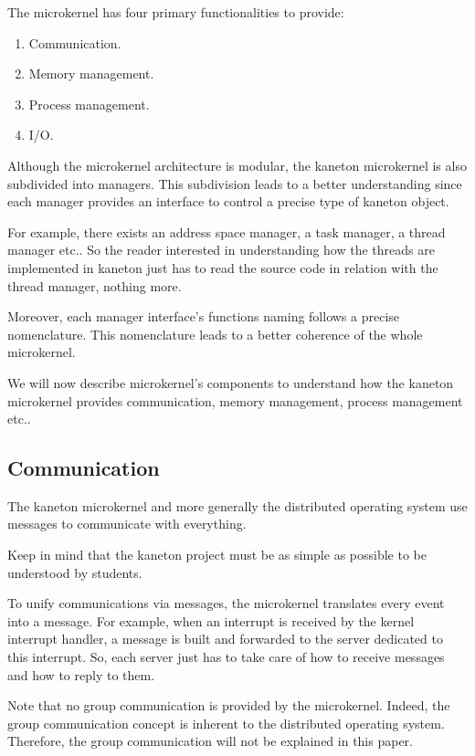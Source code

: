 \begin{multicols}{2}
The microkernel has four primary functionalities to provide:

\begin{enumerate}
  \item
    Communication.
  \item
    Memory management.
  \item
    Process management.
  \item
    I/O.
\end{enumerate}

Although the microkernel architecture is modular, the kaneton microkernel
is also subdivided into managers. This subdivision leads to a better
understanding since each manager provides an interface to control a
precise type of kaneton object.

For example, there exists an address space manager, a task manager,
a thread manager etc.. So the reader interested in understanding how
the threads are implemented in kaneton just has to read the source code
in relation with the thread manager, nothing more.

Moreover, each manager interface's functions naming follows a precise
nomenclature. This nomenclature leads to a better coherence of the whole
microkernel.

We will now describe microkernel's components to understand how the kaneton
microkernel provides communication, memory management, process
management etc..

%
%

\subsection{Communication}

The kaneton microkernel and more generally the distributed operating
system use messages to communicate with everything.

Keep in mind that the kaneton project must be as simple as possible to be
understood by students.

To unify communications via messages, the microkernel translates every event
into a message. For example, when an interrupt is received by the kernel
interrupt handler, a message is built and forwarded to the server dedicated
to this interrupt. So, each server just has to take care of how to receive
messages and how to reply to them.

Note that no group communication is provided by the microkernel. Indeed, the
group communication concept is inherent to the distributed operating system.
Therefore, the group communication will not be explained in this paper.


\end{multicols}
